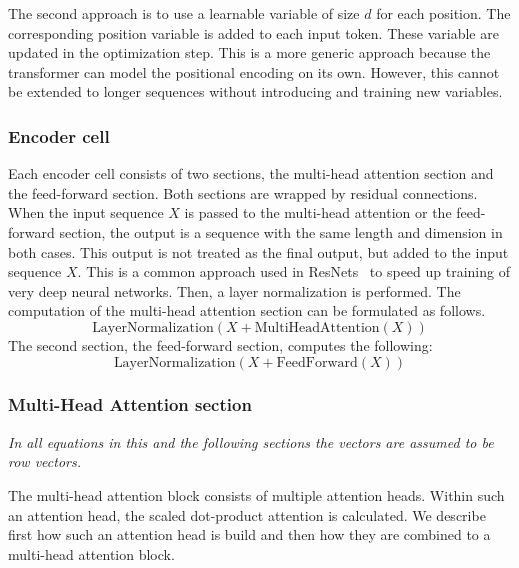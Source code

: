 \documentclass[a4paper]{scrartcl}
\begin{document}
    The second approach is to use a learnable variable of size $d$ for each position.
    The corresponding position variable is added to each input token.
    These variable are updated in the optimization step.
    This is a more generic approach because the transformer can model the positional encoding on its own.
    However, this cannot be extended to longer sequences without introducing and training new variables.

    \subsubsection{Encoder cell}
    Each encoder cell consists of two sections, the multi-head attention section and the feed-forward section.
    Both sections are wrapped by residual connections.
    When the input sequence $X$ is passed to the multi-head attention or the feed-forward section, the output is a sequence with the same length and dimension in both cases.
    This output is not treated as the final output, but added to the input sequence $X$.
    This is a common approach used in ResNets~\cite{he2015deep} to speed up training of very deep neural networks.
    Then, a layer normalization is performed.
    The computation of the multi-head attention section can be formulated as follows.
    \begin{equation}
        \text{LayerNormalization}(X + \text{MultiHeadAttention}(X))\label{eq:attention}
    \end{equation}
    The second section, the feed-forward section, computes the following:
    \begin{equation}
        \text{LayerNormalization}(X + \text{FeedForward}(X))\label{eq:feedforward}
    \end{equation}

    \subsubsection{Multi-Head Attention section}\label{subsubsec:multi-head-attention-section}
    \textit{In all equations in this and the following sections the vectors are assumed to be row vectors.}

    \bigskip

    The multi-head attention block consists of multiple attention heads.
    Within such an attention head, the scaled dot-product attention is calculated.
    We describe first how such an attention head is build and then how they are combined to a multi-head attention block.
\end{document}
